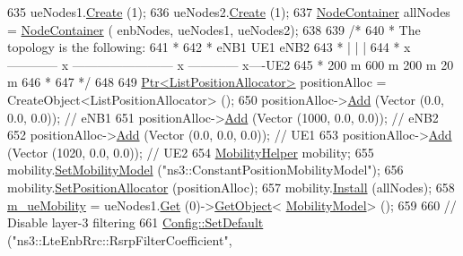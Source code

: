 \begin{DoxyCode}
635   ueNodes1.\hyperlink{classns3_1_1NodeContainer_a787f059e2813e8b951cc6914d11dfe69}{Create} (1);
636   ueNodes2.\hyperlink{classns3_1_1NodeContainer_a787f059e2813e8b951cc6914d11dfe69}{Create} (1);
637   \hyperlink{classns3_1_1NodeContainer}{NodeContainer} allNodes = \hyperlink{classns3_1_1NodeContainer}{NodeContainer} ( enbNodes, ueNodes1, ueNodes2);
638 
639   \textcolor{comment}{/*}
640 \textcolor{comment}{   * The topology is the following:}
641 \textcolor{comment}{   *}
642 \textcolor{comment}{   *  eNB1            UE1                                      eNB2}
643 \textcolor{comment}{   *    |              |                                         |}
644 \textcolor{comment}{   *    x ------------ x ------------------------ x ------------ x----UE2}
645 \textcolor{comment}{   *         200 m               600 m                  200 m      20 m}
646 \textcolor{comment}{   *}
647 \textcolor{comment}{   */}
648 
649   \hyperlink{classns3_1_1Ptr}{Ptr<ListPositionAllocator>} positionAlloc = CreateObject<ListPositionAllocator> 
      ();
650   positionAlloc->\hyperlink{classns3_1_1ListPositionAllocator_a460e82f015ac012a73ba0ea0cccb3486}{Add} (Vector (0.0, 0.0, 0.0));   \textcolor{comment}{// eNB1}
651   positionAlloc->\hyperlink{classns3_1_1ListPositionAllocator_a460e82f015ac012a73ba0ea0cccb3486}{Add} (Vector (1000, 0.0, 0.0)); \textcolor{comment}{// eNB2}
652   positionAlloc->\hyperlink{classns3_1_1ListPositionAllocator_a460e82f015ac012a73ba0ea0cccb3486}{Add} (Vector (0.0, 0.0, 0.0));  \textcolor{comment}{// UE1}
653   positionAlloc->\hyperlink{classns3_1_1ListPositionAllocator_a460e82f015ac012a73ba0ea0cccb3486}{Add} (Vector (1020, 0.0, 0.0));  \textcolor{comment}{// UE2}
654   \hyperlink{classns3_1_1MobilityHelper}{MobilityHelper} mobility;
655   mobility.\hyperlink{classns3_1_1MobilityHelper_a030275011b6f40682e70534d30280aba}{SetMobilityModel} (\textcolor{stringliteral}{"ns3::ConstantPositionMobilityModel"});
656   mobility.\hyperlink{classns3_1_1MobilityHelper_ac59d5295076be3cc11021566713a28c5}{SetPositionAllocator} (positionAlloc);
657   mobility.\hyperlink{classns3_1_1MobilityHelper_a07737960ee95c0777109cf2994dd97ae}{Install} (allNodes);
658   \hyperlink{classLteFrAreaTestCase_ae2f235fc4d87154ef9f32bc0d92ef2ca}{m\_ueMobility} = ueNodes1.\hyperlink{classns3_1_1NodeContainer_a9ed96e2ecc22e0f5a3d4842eb9bf90bf}{Get} (0)->\hyperlink{classns3_1_1Object_a13e18c00017096c8381eb651d5bd0783}{GetObject}<
      \hyperlink{classns3_1_1MobilityModel}{MobilityModel}> ();
659 
660   \textcolor{comment}{// Disable layer-3 filtering}
661   \hyperlink{group__config_ga2e7882df849d8ba4aaad31c934c40c06}{Config::SetDefault} (\textcolor{stringliteral}{"ns3::LteEnbRrc::RsrpFilterCoefficient"},

\end{DoxyCode}

